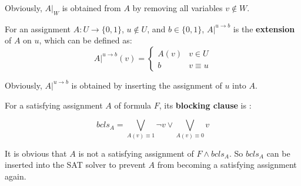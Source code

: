 \documentclass[journal]{IEEEtran}
\begin{document}
Obviously, $A|_W$ is obtained from $A$ by removing all variables $v\notin W$.

For an assignment $A:U\to \{0,1\}$,
$u\notin U$,
and $b\in \{0,1\}$, $A|^{u\to b}$ is the \textbf{extension} of $A$ on $u$,
which can be defined as:
\begin{displaymath}
A|^{u\to b}(v) = \left\{ \begin{array}{ll}
A(v) & v\in U \\
b & v\equiv u
\end{array}
\right.
\end{displaymath}

Obviously, $A|^{u\to b}$ is obtained by inserting the assignment of $u$ into $A$.



For a satisfying assignment $A$ of formula $F$,
its \textbf{blocking clause} is :

\begin{equation}\label{BCLS}
bcls_A=\bigvee _{A(v)\equiv 1}\neg v\vee \bigvee _{A(v)\equiv 0}v
\end{equation}

It is obvious that $A$ is not a satisfying assignment of $F\wedge bcls_A$.
So $bcls_A$ can be inserted into the SAT solver to prevent $A$ from becoming a satisfying assignment again.
\end{document}
